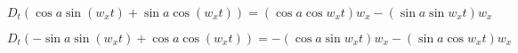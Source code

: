 \documentclass{article}%
\begin{document}
$D_{t}\left(  \cos a\sin\left(  w_{x}t\right)  +\sin a\cos\left(
w_{x}t\right)  \right)  =\allowbreak\left(  \cos a\cos w_{x}t\right)
w_{x}-\left(  \sin a\sin w_{x}t\right)  w_{x}$

$D_{t}\left(  -\sin a\sin\left(  w_{x}t\right)  +\cos a\cos\left(
w_{x}t\right)  \right)  =\allowbreak-\left(  \cos a\sin w_{x}t\right)
w_{x}-\left(  \sin a\cos w_{x}t\right)  w_{x}$
\end{document}
